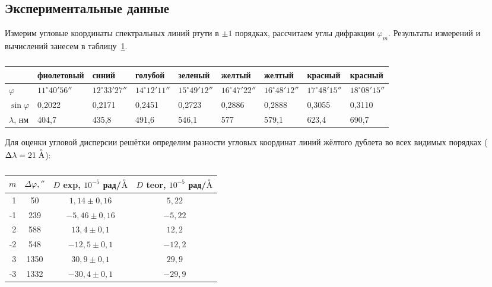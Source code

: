 \documentclass[a4paper,12pt]{article} %
\begin{document}
	\subsection{Экспериментальные данные}
		Измерим угловые координаты спектральных линий ртути в $ \pm1 $ порядках, рассчитаем углы дифракции $\varphi_m$. Результаты измерений и вычислений занесем в таблицу~\ref{table:exp1}.
		\begin{table}[H]
			\caption{}
			\label{table:exp1}
			\begin{tabular}{|p{0.96cm}|p{2.2cm}|p{1.5cm}|p{1.5cm}|p{1.5cm}|p{1.5cm}|p{1.5cm}|p{1.5cm}|p{1.5cm}|}
				\hline
				& фиолетовый & синий  & голубой & зеленый & желтый & желтый & красный & красный \\ \hline
				$ \varphi $& $11^{\circ}40'56''$ & $12^{\circ}33'27'' $& $14^{\circ}12'11''$ & $15^{\circ}49'12'' $& $16^{\circ}47'22'' $& $16^{\circ}48'12''$ & $17^{\circ}48'15'' $& $18^{\circ}08'15''$ \\ \hline
				$\sin \varphi$& 0,2022     & 0,2171 & 0,2451  & 0,2723  & 0,2886 & 0,2888 & 0,3055  & 0,3110  \\ \hline
				$ \lambda $, нм & 404,7      & 435,8  & 491,6   & 546,1   & 577    & 579,1  & 623,4   & 690,7   \\ \hline
			\end{tabular}
		\end{table}
		Для оценки угловой дисперсии решётки определим разности угловых координат линий жёлтого дублета во всех видимых порядках ($ \Delta \lambda = 21  \buildrel _{\circ} \over {\mathrm{A}} $):
		\begin{table}[H]
			\caption{}
			\label{table:exp2}
			\begin{tabular}{|r|c|c|c|}
				\hline
				$m$  & $ \Delta \varphi , ''$  & $D$ exp,  $ 10^{-5} $ рад/$  \buildrel _{\circ} \over {\mathrm{A}}$   & $D$ teor,   $ 10^{-5} $ рад/$  \buildrel _{\circ} \over {\mathrm{A}}$   \\ \hline
				1  &50      & $1,14\pm 0,16$ & $5,22$  \\ \hline
				-1 & 239     &$-5,46\pm0,16$ & $-5,22$ \\ \hline
				2  & 588     &$13,4\pm0,1$ & $12,2$  \\ \hline
				-2 & 548     &$-12,5\pm 0,1$ & $-12,2$ \\ \hline
				3  & 	1350    &$30,9\pm 0,1$ & $29,9$  \\ \hline
				-3 &1332    & $-30,4\pm 0,1$ & $-29,9$ \\ \hline
			\end{tabular}
		\end{table}
\end{document}

